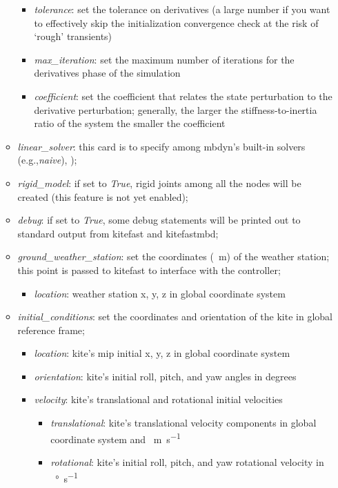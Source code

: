 \documentclass[report]{nrel}
\def\eg{e.g., }
\def\eg{e.g.,}
\begin{document}
\begin{itemize}
\begin{itemize}
		\begin{itemize}
			\item \emph{tolerance}: set the tolerance on derivatives (a large number if you want to effectively skip the initialization convergence check at the risk of `rough' transients)
			\item \emph{max\_iteration}: set the maximum number of iterations for the derivatives phase of the simulation
			\item \emph{coefficient}: set the coefficient that relates the state perturbation to the derivative perturbation; generally, the larger the stiffness-to-inertia ratio of the system the smaller the coefficient
		\end{itemize}
		\item \emph{linear\_solver}: this card is to specify among \gls{mbdyn}'s built-in solvers (\eg \emph{naive}), \citep[see][]{masarati2017});
		\item \emph{rigid\_model}: if set to \emph{True}, rigid joints among all the nodes will be created (this feature is not yet enabled);
%
		\item \emph{debug}: if set to \emph{True}, some debug statements will be printed out to standard output from  \gls{kitefast} and \gls{kitefastmbd};
%
		\item \emph{ground\_weather\_station}: set the coordinates (\SI{}{\m}) of the weather station; this point is passed to \gls{kitefast} to interface with the controller;
			\begin{itemize}
				\item \emph{location}: weather station x, y, z in global coordinate system 
			\end{itemize}
%
		\item \emph{initial\_conditions}: set the coordinates and orientation of the kite in global reference frame;
			\begin{itemize}
				\item \emph{location}: kite's \gls{mip} initial x, y, z in global coordinate system 
				\item \emph{orientation}: kite's initial roll, pitch, and yaw angles in degrees
				\item \emph{velocity}: kite's translational and rotational initial velocities
				\begin{itemize}
					\item \emph{translational}: kite's translational velocity components in global coordinate system and \SI{}{\m\per\s}
					\item \emph{rotational}: kite's initial roll, pitch, and yaw rotational velocity in \SI{}{\degree \per \s}

\end{itemize}
\end{itemize}
\end{itemize}
\end{itemize}
\end{document}
